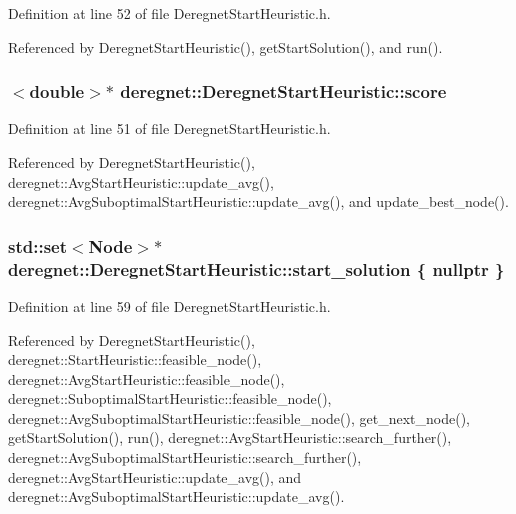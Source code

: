 Definition at line 52 of file Deregnet\+Start\+Heuristic.\+h.



Referenced by Deregnet\+Start\+Heuristic(), get\+Start\+Solution(), and run().

\subsubsection[{\texorpdfstring{score}{score}}]{$<$double$>$$\ast$ deregnet\+::\+Deregnet\+Start\+Heuristic\+::score\hspace{0.3cm}{\ttfamily [protected]}}\hypertarget{classderegnet_1_1DeregnetStartHeuristic_ae03300e79482975e98f95cba19ad32b0}{}\label{classderegnet_1_1DeregnetStartHeuristic_ae03300e79482975e98f95cba19ad32b0}


Definition at line 51 of file Deregnet\+Start\+Heuristic.\+h.



Referenced by Deregnet\+Start\+Heuristic(), deregnet\+::\+Avg\+Start\+Heuristic\+::update\+\_\+avg(), deregnet\+::\+Avg\+Suboptimal\+Start\+Heuristic\+::update\+\_\+avg(), and update\+\_\+best\+\_\+node().

\subsubsection[{\texorpdfstring{start\+\_\+solution}{start_solution}}]{\setlength{\rightskip}{0pt plus 5cm}std\+::set$<${\bf Node}$>$$\ast$ deregnet\+::\+Deregnet\+Start\+Heuristic\+::start\+\_\+solution \{ nullptr \}\hspace{0.3cm}{\ttfamily [protected]}}\hypertarget{classderegnet_1_1DeregnetStartHeuristic_a7450e11ca0a265b055f95e7832b65e2f}{}\label{classderegnet_1_1DeregnetStartHeuristic_a7450e11ca0a265b055f95e7832b65e2f}


Definition at line 59 of file Deregnet\+Start\+Heuristic.\+h.



Referenced by Deregnet\+Start\+Heuristic(), deregnet\+::\+Start\+Heuristic\+::feasible\+\_\+node(), deregnet\+::\+Avg\+Start\+Heuristic\+::feasible\+\_\+node(), deregnet\+::\+Suboptimal\+Start\+Heuristic\+::feasible\+\_\+node(), deregnet\+::\+Avg\+Suboptimal\+Start\+Heuristic\+::feasible\+\_\+node(), get\+\_\+next\+\_\+node(), get\+Start\+Solution(), run(), deregnet\+::\+Avg\+Start\+Heuristic\+::search\+\_\+further(), deregnet\+::\+Avg\+Suboptimal\+Start\+Heuristic\+::search\+\_\+further(), deregnet\+::\+Avg\+Start\+Heuristic\+::update\+\_\+avg(), and deregnet\+::\+Avg\+Suboptimal\+Start\+Heuristic\+::update\+\_\+avg().

